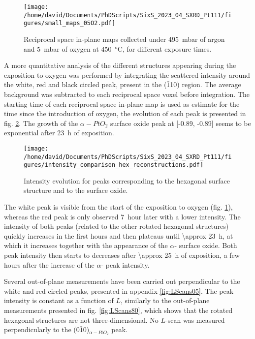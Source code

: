 \begin{figure}[!htb]
    \centering
    \texttt{[image: /home/david/Documents/PhDScripts/SixS\_2023\_04\_SXRD\_Pt111/figures/small\_maps\_05O2.pdf]}
    \caption{
        Reciprocal space in-plane maps collected under \qty{495}{\milli\bar} of argon and \qty{5}{\milli\bar} of oxygen at \qty{450}{\degreeCelsius}, for different exposure times.
    }
    \label{fig:SmallMapsPt111LowOxygen}
\end{figure}

A more quantitative analysis of the different structures appearing during the exposition to oxygen was performed by integrating the scattered intensity around the white, red and black circled peak, present in the ($\bar{1}$10) region.
The average background was subtracted to each reciprocal space voxel before integration.
The starting time of each reciprocal space in-plane map is used as estimate for the time since the introduction of oxygen, the evolution of each peak is presented in fig. \ref{fig:HexBraggPeaks}.
The growth of the ${\alpha-PtO_2}$ surface oxide peak at [-0.89, -0.89] seems to be exponential after \qty{23}{\hour} of exposition.

\begin{figure}[!htb]
    \centering
    \texttt{[image: /home/david/Documents/PhDScripts/SixS\_2023\_04\_SXRD\_Pt111/figures/intensity\_comparison\_hex\_reconstructions.pdf]}
    \caption{
        Intensity evolution for peaks corresponding to the hexagonal surface structure and to the surface oxide.
    }
    \label{fig:HexBraggPeaks}
\end{figure}

The white peak is visible from the start of the exposition to oxygen (fig. \ref{fig:SmallMapsPt111LowOxygen}), whereas the red peak is only observed \qty{7}{hour} later with a lower intensity.
The intensity of both peaks (related to the other rotated hexagonal structures) quickly increases in the first hours and then plateaus until \qty{\approx 23}{\hour}, at which it increases together with the appearance of the $\alpha$- surface oxide.
Both peak intensity then starts to decreases after \qty{\approx 25}{\hour} of exposition, a few hours after the increase of the $\alpha$- peak intensity.

Several out-of-plane measurements have been carried out perpendicular to the white and red circled peaks, presented in appendix \ref{fig:LScans05}.
The peak intensity is constant as a function of $L$, similarly to the out-of-plane measurements presented in fig. \ref{fig:LScans80}, which shows that the rotated hexagonal structures are not three-dimensional.
No $L$-scan was measured perpendicularly to the ($0\bar{1}$0)$_{\alpha-PtO_2}$ peak.

